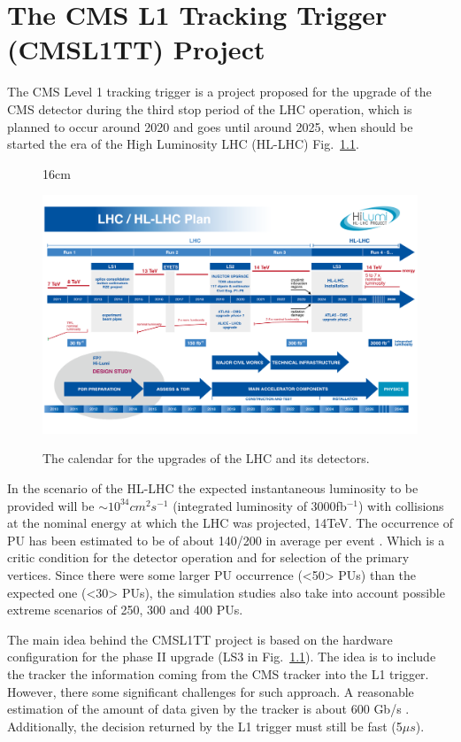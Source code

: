 \chapter{The CMS L1 Tracking Trigger (CMSL1TT) Project}
\label{app:cmsl1tt}
The CMS Level 1 tracking trigger is a project proposed for the upgrade of the CMS detector during the third stop period of the LHC operation, which is planned to occur around 2020 and goes until around 2025, when should be started the era of the High Luminosity LHC (HL-LHC) Fig.~\ref{fig:lhc_calendar}. 

\begin{figure}[htbp]{16cm}
	\caption{The calendar for the upgrades of the LHC and its detectors.}
	\centering
	\includegraphics[scale=0.9,angle=90]{AppendixCMSL1TT/figs/Schedule_HLLHC}
	\label{fig:lhc_calendar}
\end{figure}

In the scenario of the HL-LHC the expected instantaneous luminosity to be provided will be $\sim 10 ^{34} cm^{2}s^{-1}$ (integrated luminosity of 3000fb$^{-1}$) with collisions at the nominal energy at which the LHC was projected, 14TeV. The occurrence of PU has been estimated to be of about 140/200 in average per event \cite{bib:vertex-2017}. Which is a critic condition for the detector operation and for selection of the primary vertices. Since there were some larger PU occurrence (<50> PUs) than the expected one (<30> PUs), the simulation studies also take into account possible extreme scenarios of 250, 300 and 400 PUs. 

The main idea behind the CMSL1TT project is based on the hardware configuration for the phase II upgrade (LS3 in Fig.~\ref{fig:lhc_calendar}). The idea is to include the tracker the information coming from the CMS tracker into the L1 trigger. However, there some significant challenges for such approach. A reasonable estimation of the amount of data given by the tracker is about 600 Gb/s \cite{bib:vertex-2017}. Additionally, the decision returned by the L1 trigger must still be fast (5$\mu s$).

